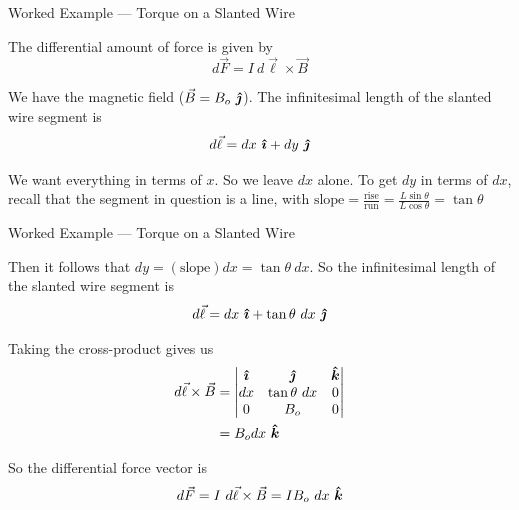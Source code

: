 \documentclass{beamer}
\begin{document}
\begin{frame}{Worked Example --- Torque on a Slanted Wire}

The differential amount of force is given by
\begin{equation*}
    d\vec{F} = I\ d\vec{\ell} \times \vec{B}
\end{equation*}

We have the magnetic field ($\vec{B} = B_o\ \jhat$). The infinitesimal length of the slanted wire segment is
\begin{equation*}
    d\vec{\ell} = dx\ \ihat + dy\ \jhat
\end{equation*}

We want everything in terms of $x$. So we leave $dx$ alone. To get $dy$ in terms of $dx$, recall that the segment in question is a line, with $\text{slope} = \frac{\text{rise}}{\text{run}} = \frac{L\sin{\theta}}{L\cos{\theta}} = \tan{\theta}$

\end{frame}

\begin{frame}{Worked Example --- Torque on a Slanted Wire}

Then it follows that $dy = \left( \text{slope} \right) dx = \tan{\theta}\ dx$. So the infinitesimal length of the slanted wire segment is
\begin{equation*}
    d\vec{\ell} = dx\ \ihat + \tan{\theta}\ dx\ \jhat
\end{equation*}

Taking the cross-product gives us
\begin{align*}
    d\vec{\ell} \times \vec{B} &= \begin{vmatrix} \bm{\hat{\imath}} & \bm{\hat{\jmath}} & \bm{\hat{k}} \\ dx & \tan{\theta}\ dx & 0 \\ 0 & B_o & 0 \end{vmatrix} \\
    &= B_o dx\ \bm{\hat{k}}
\end{align*}

So the differential force vector is
\begin{equation*}
    d\vec{F} = I\ d\vec{\ell} \times \vec{B} = IB_o\ dx\ \khat
\end{equation*}

\end{frame}
\end{document}
